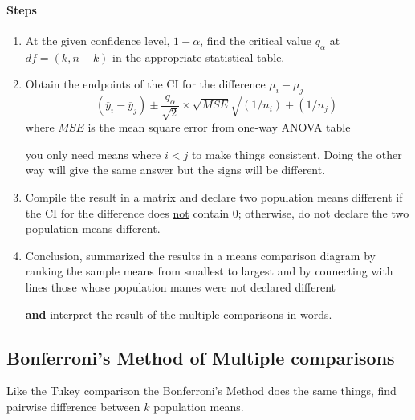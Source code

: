 \documentclass[../STAT-252-Notes.tex]{subfiles}
\begin{document}
\paragraph{Steps}

\begin{enumerate}
  \item At the given confidence level, $1-\alpha$, find the critical value $q_\alpha$ at $df = (k, n-k)$ in the appropriate statistical table.
  \item Obtain the endpoints of the CI for the difference $\mu_i - \mu_j$ 
    \[ 
    (\overline{y}_i - \overline{y}_j) \pm \frac{q_\alpha}{\sqrt{2}} \times \sqrt{MSE} \sqrt{(1 / n_i) + (1 / n_j)} \  
    \] 
    where $MSE$ is the mean square error from one-way ANOVA table

    you only need means where $i < j$ to make things consistent. Doing the other way will give the same answer but the signs will be different.

    \item Compile the result in a matrix and declare two population means different if the CI for the difference does \underline{not} contain 0; otherwise, do not declare the two population means different.
    \item Conclusion, summarized the results in a means comparison diagram by ranking the sample means from smallest to largest and by connecting with lines those whose population manes were not declared different
      
      \textbf{and} interpret the result of the multiple comparisons in words.
\end{enumerate}





\subsection{Bonferroni's Method of Multiple comparisons}
Like the Tukey comparison the Bonferroni's Method does the same things, find pairwise difference between $k$ population means.
~\\~\\
\end{document}
